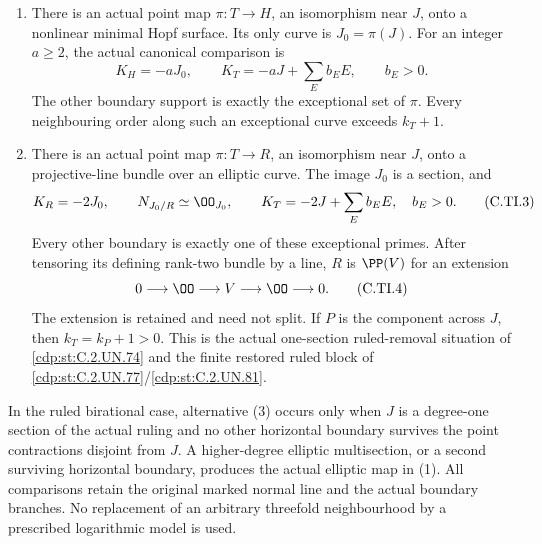 \begin{proposition}
\begin{enumerate}
\item There is an actual point map \(\pi:T\to H\),
an isomorphism near \(J\), onto a nonlinear minimal
Hopf surface. Its only curve is \(J_0=\pi(J)\).
For an integer \(a\ge2\), the actual canonical
comparison is
\[
 K_H=-aJ_0,\qquad
 K_T=-aJ+\sum_E b_EE,\qquad b_E>0.
 \tag{C.TI.2}\label{cdp:eq:C.TI.2}
\]
The other boundary support is exactly the exceptional
set of \(\pi\). Every neighbouring order along such
an exceptional curve exceeds \(k_T+1\).

\item There is an actual point map \(\pi:T\to R\),
an isomorphism near \(J\), onto a projective-line
bundle over an elliptic curve. The image \(J_0\)
is a section, and
\[
 K_R=-2J_0,\qquad N_{J_0/R}\simeq\OO_{J_0},\qquad
 K_T=-2J+\sum_E b_EE,\quad b_E>0.
 \tag{C.TI.3}\label{cdp:eq:C.TI.3}
\]
Every other boundary is exactly one of these
exceptional primes. After tensoring its defining
rank-two bundle by a line, \(R\) is
\(\PP(V)\) for an extension
\[
              0\longrightarrow\OO\longrightarrow V
                    \longrightarrow\OO\longrightarrow0.
 \tag{C.TI.4}\label{cdp:eq:C.TI.4}
\]
The extension is retained and need not split.
If \(P\) is the component across \(J\), then
\(k_T=k_P+1>0\). This is the actual one-section
ruled-removal situation of \ref{cdp:st:C.2.UN.74} and the finite
restored ruled block of \ref{cdp:st:C.2.UN.77}/\ref{cdp:st:C.2.UN.81}.
\end{enumerate}

In the ruled birational case, alternative (3) occurs
only when \(J\) is a degree-one section of the actual
ruling and no other horizontal boundary survives the
point contractions disjoint from \(J\). A higher-degree
elliptic multisection, or a second surviving horizontal
boundary, produces the actual elliptic map in (1).
All comparisons retain the original marked normal line
and the actual boundary branches. No replacement of an
arbitrary threefold neighbourhood by a prescribed
logarithmic model is used.
\end{proposition}

